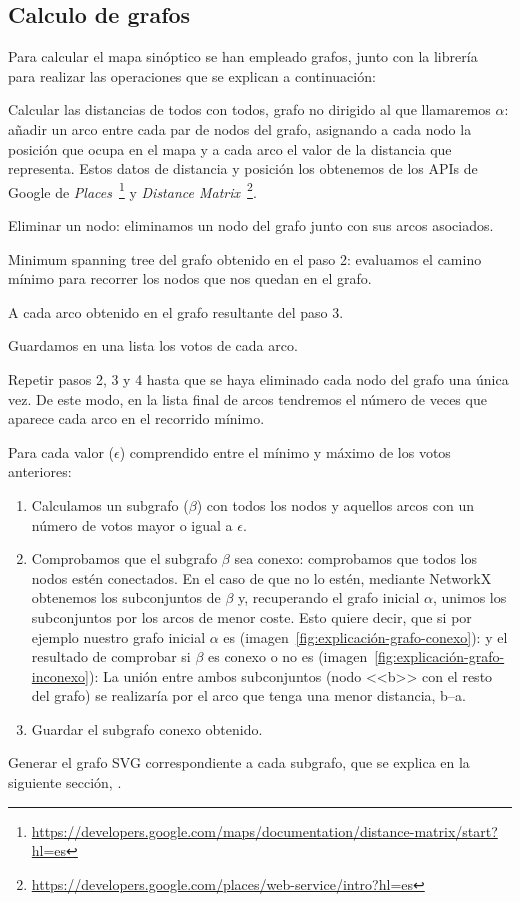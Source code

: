 \subsection{Calculo de grafos}\label{sub:grafos-aspectos-relevantes}
Para calcular el mapa sinóptico se han empleado grafos, junto con la librería~ para realizar las operaciones que se explican a continuación:

\begin{steps}
	\item Calcular las distancias de todos con todos, grafo no dirigido al que llamaremos $\alpha$: añadir un arco entre cada par de nodos del grafo, asignando a cada nodo la posición que ocupa en el mapa y a cada arco el valor de la distancia que representa. Estos datos de distancia y posición los obtenemos de los APIs de Google de \textit{Places}~\footnote{\url{https://developers.google.com/maps/documentation/distance-matrix/start?hl=es}} y \textit{Distance Matrix}~\footnote{\url{https://developers.google.com/places/web-service/intro?hl=es}}.
	\item Eliminar un nodo: eliminamos un nodo del grafo junto con sus arcos asociados.
	\item Minimum spanning tree del grafo obtenido en el paso 2: evaluamos el camino mínimo para recorrer los nodos que nos quedan en el grafo.
	\item A cada arco obtenido en el grafo resultante del paso 3.
	\item Guardamos en una lista los votos de cada arco.
	\item Repetir pasos 2, 3 y 4 hasta que se haya eliminado cada nodo del grafo una única vez. De este modo, en la lista final de arcos tendremos el número de veces que aparece cada arco en el recorrido mínimo.
	\item Para cada valor ($\epsilon$) comprendido entre el mínimo y máximo de los votos anteriores:
	\begin{enumerate}
		\item Calculamos un subgrafo ($\beta$) con todos los nodos y aquellos arcos con un número de votos mayor o igual a $\epsilon$.
		\item Comprobamos que el subgrafo $\beta$ sea conexo: comprobamos que todos los nodos estén conectados. En el caso de que no lo estén, mediante NetworkX obtenemos los subconjuntos de $\beta$ y, recuperando el grafo inicial $\alpha$, unimos los subconjuntos por los arcos de menor coste. Esto quiere decir, que si por ejemplo nuestro grafo inicial $\alpha$ es (imagen~\ref{fig:explicación-grafo-conexo}):
		y el resultado de comprobar si $\beta$ es conexo o no es (imagen~\ref{fig:explicación-grafo-inconexo}):
		La unión entre ambos subconjuntos (nodo <<b>> con el resto del grafo) se realizaría por el arco que tenga una menor distancia, b--a.
		\item Guardar el subgrafo conexo obtenido.
	\end{enumerate}
	\item Generar el grafo SVG correspondiente a cada subgrafo, que se explica en la siguiente sección, .
\end{steps}
